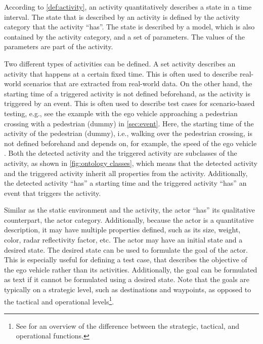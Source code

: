 According to \cref{def:activity}, an activity quantitatively describes a state in a time interval. The state that is described by an activity is defined by the activity category that the activity ``has''. The state is described by a model, which is also contained by the activity category, and a set of parameters. The values of the parameters are part of the activity. 

\cbstart
Two different types of activities can be defined. A set activity describes an activity that happens at a certain fixed time. This is often used to describe real-world scenarios that are extracted from real-world data. On the other hand, the starting time of a triggered activity is not defined beforehand, as the activity is triggered by an event. This is often used to describe test cases for scenario-based testing, e.g., see the example with the ego vehicle approaching a pedestrian crossing with a pedestrian (dummy) in \cref{sec:event}. Here, the starting time of the activity of the pedestrian (dummy), i.e., walking over the pedestrian crossing, is not defined beforehand and depends on, for example, the speed of the ego vehicle \cite{seiniger2015test}. Both the detected activity and the triggered activity are subclasses of the activity, as shown in \cref{fig:ontology classes}, which means that the detected activity and the triggered activity inherit all properties from the activity. Additionally, the detected activity ``has'' a starting time and the triggered activity ``has'' an event that triggers the activity.
\cbend

\cbstart
Similar as the static environment and the activity, the actor ``has'' its qualitative counterpart, the actor category. Additionally, because the actor is a quantitative description, it may have multiple properties defined, such as its size, weight, color, radar reflectivity factor, etc. The actor may have an initial state and a desired state. The desired state can be used to formulate the goal of the actor. This is especially useful for defining a test case, that describes the objective of the ego vehicle rather than its activities. Additionally, the goal can be formulated as text if it cannot be formulated using a desired state.
Note that the goals are typically on a strategic level, such as destinations and waypoints, as opposed to the tactical and operational levels\footnote{\cbstart See \cite[p.~7, Figure 1]{sae2018j3016} for an overview of the difference between the strategic, tactical, and operational functions.\cbend}.
\cbend


